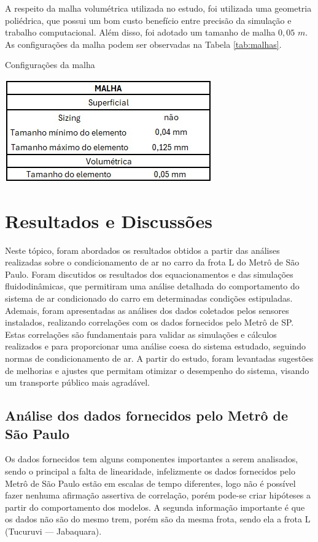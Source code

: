\documentclass[acronym,symbols,table]{fei}
\begin{document}
A respeito da malha volumétrica utilizada no estudo, foi utilizada uma geometria poliédrica, que possui um bom custo benefício entre precisão da simulação e trabalho computacional. Além disso, foi adotado um tamanho de malha $0,05$ $m$. As configurações da malha podem ser observadas na Tabela \ref{tab:malhas}.

\begin{table}[!htb]
    \centering
    \caption{Configurações da malha}
    \includegraphics[width=0.5\linewidth]{Tabelas/malhas.jpeg}
    \label{tab:malhas}
\end{table}

\chapter{Resultados e Discussões}

Neste tópico, foram abordados os resultados obtidos a partir das análises realizadas sobre o condicionamento de ar no carro da frota L do Metrô de São Paulo. Foram discutidos os resultados dos equacionamentos e das simulações fluidodinâmicas, que permitiram uma análise detalhada do comportamento do sistema de ar condicionado do carro em determinadas condições estipuladas. Ademais, foram apresentadas as análises dos dados coletados pelos sensores instalados, realizando correlações com os dados fornecidos pelo Metrô de SP. Estas correlações são fundamentais para validar as simulações e cálculos realizados e para proporcionar uma análise coesa do sistema estudado, seguindo normas de condicionamento de ar. A partir do estudo, foram levantadas sugestões de melhorias e ajustes que permitam otimizar o desempenho do sistema, visando um transporte público mais agradável.

\section{Análise dos dados fornecidos pelo Metrô de São Paulo}

Os dados fornecidos tem alguns componentes importantes a serem analisados, sendo o principal a falta de linearidade, infelizmente os dados fornecidos pelo Metrô de São Paulo estão em escalas de tempo diferentes, logo não é possível fazer nenhuma afirmação assertiva de correlação, porém pode-se criar hipóteses a partir do comportamento dos modelos. A segunda informação importante é que os dados não são do mesmo trem, porém são da mesma frota, sendo ela a frota L (Tucuruvi — Jabaquara).
\end{document}
